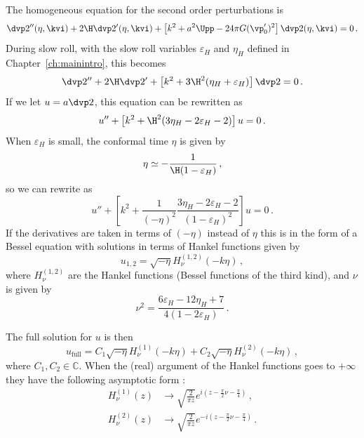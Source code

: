 The homogeneous equation for the second order perturbations is  
% 
\begin{equation}
\label{eq:homogen-corr}
 \dvp2''(\eta, \kvi) + 2\H \dvp2'(\eta, \kvi) 
+ \left[ k^2 + a^2\Upp - 24\pi G (\vp_0')^2 \right]\dvp2(\eta,\kvi) = 0\,.
\end{equation}
% 
During slow roll, with the slow roll variables $\varepsilon_H$ and $\eta_H$ defined in
Chapter~\ref{ch:mainintro}, this becomes
% 
\begin{equation}
 \dvp2'' + 2\H \dvp2' + \left[k^2 + 3\H^2(\eta_H + \varepsilon_H)\right]\dvp2 = 0\,.
\end{equation}
% 
If we let $u=a\dvp2$, this equation can be rewritten as
% 
\begin{equation}
\label{eq:uH-corr}
 u'' + \left[k^2 +\H^2(3\eta_H - 2\varepsilon_H - 2)\right]u = 0\,.
\end{equation}
% 
When $\varepsilon_H$ is small, the conformal time $\eta$ is given by 
% 
\begin{equation}
 \eta \simeq -\frac{1}{\H(1-\varepsilon_H)}\,,
\end{equation}
% 
so we can rewrite  as
% 
\begin{equation}
 u'' + \left[k^2 + \frac{1}{(-\eta)^2}\frac{3\eta_H -2\varepsilon_H -2}{(1-\varepsilon_H)^2} 
       \right]u = 0\,.
\end{equation}
% 
If the derivatives are taken in terms of $(-\eta)$ instead of $\eta$ this is in the form of a
Bessel equation with solutions in terms of Hankel functions given by
% 
\begin{equation}
 u_{1,2} = \sqrt{-\eta} H_\nu^{(1,2)}(-k\eta)\,, 
\end{equation}
% 
where $H_\nu^{(1,2)}$ are the Hankel functions (Bessel functions of the third kind), and $\nu$ is
given by
% 
\begin{equation}
 \nu^2 = \frac{6\varepsilon_H -12\eta_H + 7}{4(1-2\varepsilon_H)}\,.
\end{equation}
%

The full solution for $u$ is then
% 
\begin{equation}
 u_\mathrm{full} = C_1 \sqrt{-\eta} H_\nu^{(1)}(-k\eta) +
                   C_2 \sqrt{-\eta} H_\nu^{(2)}(-k\eta)\,,
\end{equation}
% 
where $C_1, C_2\in \mathbb{C}$. When the (real) argument of the Hankel functions goes to $+\infty$
they have the following asymptotic form \cite{abramowitz+stegun}:
% 
\begin{align}
 H_\nu^{(1)}(z) &\rightarrow \sqrt{\frac{2}{\pi z}} e^{i(z-\frac{\pi}{2}\nu - \frac{\pi}{4})} \,,\\
 H_\nu^{(2)}(z) &\rightarrow \sqrt{\frac{2}{\pi z}} e^{-i(z-\frac{\pi}{2}\nu - \frac{\pi}{4})} \,.
\end{align}
% 

